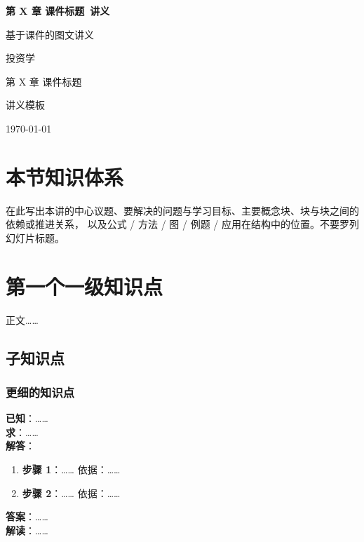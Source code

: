 \documentclass[11pt,a4paper]{ctexart}
\newcommand{\CourseName}{投资学}
\newcommand{\SlideDeckTitle}{第 X 章 课件标题}
\newcommand{\NoteTitle}{\SlideDeckTitle\ 讲义}
\newcommand{\NoteSubtitle}{基于课件的图文讲义}
\newcommand{\NoteAuthor}{讲义模板}
\newcommand{\NoteDate}{\today}
\begin{document}
\begin{titlepage}
\centering
\vspace*{3.5cm}
{\Huge\bfseries \NoteTitle\par}
\vspace{0.8cm}
{\Large \NoteSubtitle\par}
\vspace{1.5cm}
{\large \CourseName\par}
\vspace{0.4cm}
{\normalsize \SlideDeckTitle\par}
\vfill
{\large \NoteAuthor\par}
{\large \NoteDate\par}
\end{titlepage}

\tableofcontents
\newpage

\section*{本节知识体系}
\begin{structurebox}
在此写出本讲的中心议题、要解决的问题与学习目标、主要概念块、块与块之间的依赖或推进关系，
以及公式 / 方法 / 图 / 例题 / 应用在结构中的位置。不要罗列幻灯片标题。
\end{structurebox}

\section{第一个一级知识点}

正文……

\subsection{子知识点}

\subsubsection{更细的知识点}

\begin{examplebox}[Example]
\textbf{已知}：……\\
\textbf{求}：……\\
\textbf{解答}：
\begin{enumerate}
  \item \textbf{步骤 1}：…… \quad 依据：……
  \item \textbf{步骤 2}：…… \quad 依据：……
\end{enumerate}
\textbf{答案}：……\\
\textbf{解读}：……
\end{examplebox}
\end{document}
